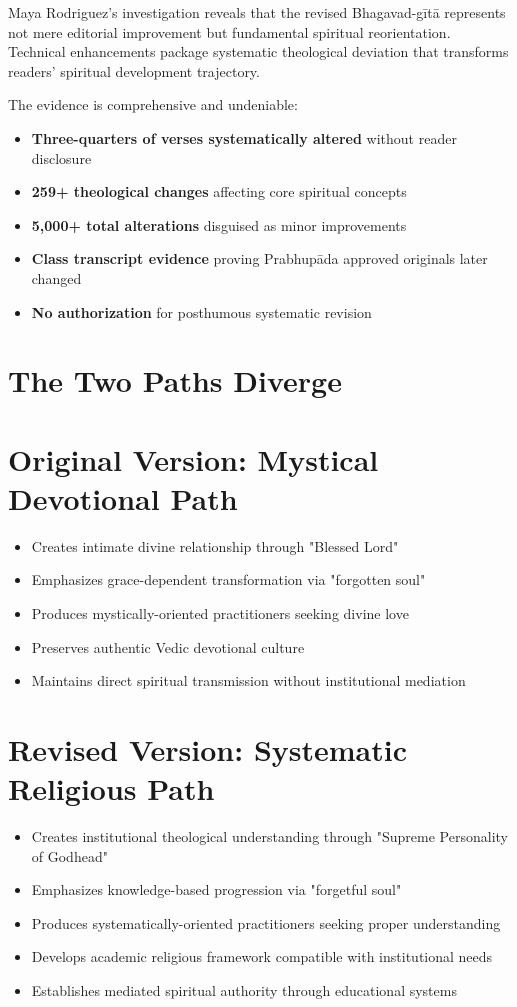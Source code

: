 \documentclass[11pt,twoside]{book}
\begin{document}
Maya Rodriguez's investigation reveals that the revised Bhagavad-gītā represents not mere editorial improvement but fundamental spiritual reorientation. Technical enhancements package systematic theological deviation that transforms readers' spiritual development trajectory.

The evidence is comprehensive and undeniable:
\begin{itemize}
\item \textbf{\textbf{Three-quarters of verses systematically altered}} without reader disclosure
\item \textbf{\textbf{259+ theological changes}} affecting core spiritual concepts
\item \textbf{\textbf{5,000+ total alterations}} disguised as minor improvements
\item \textbf{\textbf{Class transcript evidence}} proving Prabhupāda approved originals later changed
\item \textbf{\textbf{No authorization}} for posthumous systematic revision
\end{itemize}
\section*{The Two Paths Diverge}
\label{sec:orgd66c628}

\section*{Original Version: Mystical Devotional Path}
\label{sec:org1795097}
\begin{itemize}
\item Creates intimate divine relationship through "Blessed Lord"
\item Emphasizes grace-dependent transformation via "forgotten soul"
\item Produces mystically-oriented practitioners seeking divine love
\item Preserves authentic Vedic devotional culture
\item Maintains direct spiritual transmission without institutional mediation
\end{itemize}
\section*{Revised Version: Systematic Religious Path}
\label{sec:org78283e4}
\begin{itemize}
\item Creates institutional theological understanding through "Supreme Personality of Godhead"
\item Emphasizes knowledge-based progression via "forgetful soul"
\item Produces systematically-oriented practitioners seeking proper understanding
\item Develops academic religious framework compatible with institutional needs
\item Establishes mediated spiritual authority through educational systems
\end{itemize}
\end{document}
